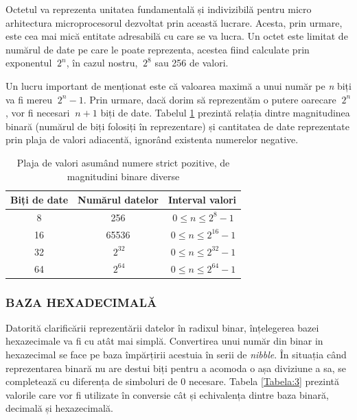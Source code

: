 \documentclass[12pt]{article}
\begin{document}
Octetul va reprezenta unitatea fundamentală și indivizibilă pentru micro arhitectura microprocesorul dezvoltat prin această lucrare. Acesta, prin urmare, este cea mai mică entitate adresabilă cu care se va lucra. Un octet este limitat de numărul de date pe care le poate reprezenta, acestea fiind calculate prin exponentul $\ 2^n$, în cazul nostru, $\ 2^8$ sau 256 de valori.

Un lucru important de menționat este că valoarea maximă a unui număr pe \textit{n} biți va fi mereu $\ 2^n -1$. Prin urmare, dacă dorim să reprezentăm o putere oarecare $\ 2^n$, vor fi necesari $\ n +1$ biți de date.
Tabelul \ref{Tabela:2} prezintă relația dintre magnitudinea binară (numărul de biți folosiți în reprezentare) și cantitatea de date reprezentate prin plaja de valori adiacentă, ignorând existenta numerelor negative.

\begin{table}[h]
\centering
\caption{Plaja de valori asumând numere strict pozitive, de magnitudini binare diverse }
\label{Tabela:2}
\begin{tabular}{ ||c|c|c|| }
 \hline
 Biți de date & Numărul datelor & Interval valori \\ 
 \hline  \hline
 8 & 256 & $\ 0 \le n \le 2^{8} - 1$ \\
 \hline
 16 & 65536 & $\ 0 \le n \le 2^{16} - 1$ \\
 \hline
 32 &  $\ 2^{32}$ & $\ 0 \le n \le 2^{32} - 1$ \\
 \hline
 64 & $\ 2^{64}$ & $\ 0 \le n \le 2^{64} -1$ \\
 \hline
\end{tabular}
\end{table}

\subsubsection{BAZA HEXADECIMALĂ}
Datorită clarificării reprezentării datelor în radixul binar, înțelegerea bazei hexazecimale va fi cu atât mai simplă. Convertirea unui număr din binar in hexazecimal se face pe baza împărțirii acestuia în serii de \textit{nibble}. În situația când reprezentarea binară nu are destui biți pentru a acomoda o așa diviziune a sa, se completează cu diferența de simboluri de 0 necesare. Tabela \ref{Tabela:3} prezintă valorile care vor fi utilizate în conversie cât și echivalența dintre baza binară, decimală și hexazecimală.
\end{document}
